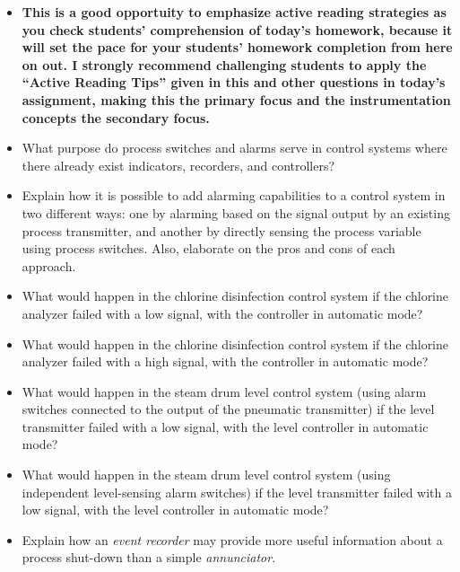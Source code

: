 \begin{itemize}
\item{} {\bf This is a good opportuity to emphasize active reading strategies as you check students' comprehension of today's homework, because it will set the pace for your students' homework completion from here on out.  I strongly recommend challenging students to apply the ``Active Reading Tips'' given in this and other questions in today's assignment, making this the primary focus and the instrumentation concepts the secondary focus.}
\item{} What purpose do process switches and alarms serve in control systems where there already exist indicators, recorders, and controllers?
\item{} Explain how it is possible to add alarming capabilities to a control system in two different ways: one by alarming based on the signal output by an existing process transmitter, and another by directly sensing the process variable using process switches.  Also, elaborate on the pros and cons of each approach.
\item{} What would happen in the chlorine disinfection control system if the chlorine analyzer failed with a low signal, with the controller in automatic mode?
\item{} What would happen in the chlorine disinfection control system if the chlorine analyzer failed with a high signal, with the controller in automatic mode?
\item{} What would happen in the steam drum level control system (using alarm switches connected to the output of the pneumatic transmitter) if the level transmitter failed with a low signal, with the level controller in automatic mode?
\item{} What would happen in the steam drum level control system (using independent level-sensing alarm switches) if the level transmitter failed with a low signal, with the level controller in automatic mode?
\item{} Explain how an {\it event recorder} may provide more useful information about a process shut-down than a simple {\it annunciator}.
\end{itemize}





